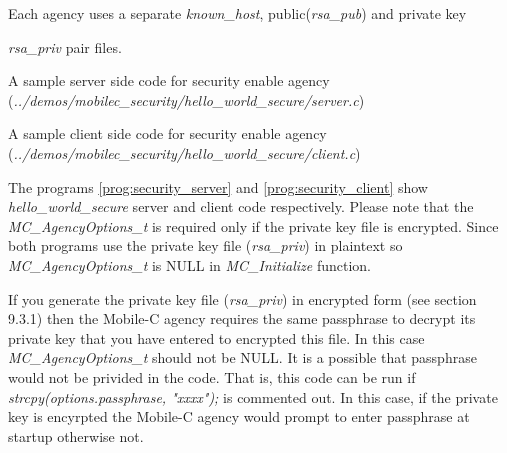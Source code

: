 \documentclass[11pt]{report}
\begin{document}
Each agency uses a separate \textit{known\_host},
  public(\textit{rsa\_pub}) and private key {\textit{rsa\_priv} pair files. 

\begin{Program}[!t]
\begin{center}
   {\footnotesize \linespread{1.0} }
\end{center}
\caption{ A sample server side code for security enable agency 
       (\textit{../demos/mobilec\_security/hello\_world\_secure/server.c})}
\label{prog:security_server}
\end{Program}

\begin{Program}[!t]
\begin{center}
   {\footnotesize \linespread{1.0} }
\end{center}
\caption{ A sample client side code for security enable agency
        (\textit{../demos/mobilec\_security/hello\_world\_secure/client.c})}
\label{prog:security_client}
\end{Program}

The programs \ref{prog:security_server} and \ref{prog:security_client} show 
  \textit{hello\_world\_secure} server and client code respectively.
Please note that the \textit{MC\_AgencyOptions\_t} is required only if the 
  private key file is encrypted. 
Since both programs use the private key file (\textit{rsa\_priv}) in plaintext
  so \textit{MC\_AgencyOptions\_t} is NULL in \textit{MC\_Initialize} function.

If you generate the private key file (\textit{rsa\_priv}) in encrypted form 
   (see section 9.3.1) then the Mobile-C agency requires the same passphrase 
    to decrypt its private key that you have entered to encrypted this file.
In this case \textit{MC\_AgencyOptions\_t} should not be NULL. 
It is a possible that passphrase would not be privided in the code. 
That is, this code can be run if 
  \textit{strcpy(options.passphrase, "xxxx");} is commented out.
In this case, if the private key is encyrpted the Mobile-C agency
  would prompt to enter passphrase at startup otherwise not. 

     

}
\end{document}
